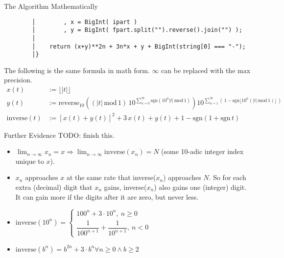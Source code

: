 \documentclass[12pt]{article}
\begin{document}
\begin{section}{The Algorithm Mathematically}
\begin{verbatim}
		│        , x = BigInt( ipart )
		│        , y = BigInt( fpart.split("").reverse().join("") );
		│
		│    return (x+y)**2n + 3n*x + y + BigInt(string[0] === "-");
		│}
	\end{verbatim}
	The following is the same formula in math form. $\infty$ can be replaced with the max precision.
	\begin{align}
		x(t) & := \lfloor|t|\rfloor\\
		y(t) & := \text{reverse}_{10}\left((|t|\,\text{mod}\,1)\,10^{\sum\limits_{n=0}^\infty\text{sgn}(10^n|t|\,\text{mod}\,1)}\right)10^{\sum\limits_{n=1}^\infty(\,1-\text{sgn}\lfloor10^n(|t|\,\text{mod}\,1)\rfloor\,)}\\
		\text{inverse}(t) & := \left[x(t) + y(t)\right]^2 + 3\,x(t) + y(t) + 1 - \text{sgn}(1+\text{sgn}\,t)
	\end{align}
\end{section}

\begin{section}{Further Evidence}\label{sec:further evidence}
	TODO: finish this.
	\begin{itemize}
		\item $\displaystyle\lim_{n\to\infty}x_n=x\Longrightarrow\lim_{n\to\infty}\text{inverse}(x_n)=N$
		(some 10-adic integer index unique to $x$).
		\item $x_n$ approaches $x$ at the same rate that inverse($x_n$) approaches $N$. So for each extra
		(decimal) digit that $x_n$ gains, inverse($x_n$) also gains one (integer) digit. It can gain more
		if the digits after it are zero, but never less.
		\item $\displaystyle
			\text{inverse}(10^n) = \begin{cases}
				100^n + 3 \cdot 10^n,~n \ge 0\\
				\dfrac1{100^{n+1}} + \dfrac1{10^{n+1}},~n < 0
			\end{cases}
		$
		\item $\text{inverse}(b^n)=b^{2n}+3\cdot b^n\forall n\ge0\land b\ge2$
	\end{itemize}
\end{section}
\end{document}
